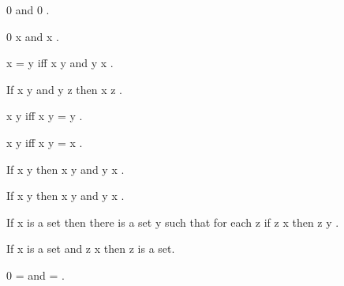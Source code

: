 \documentclass[a4paper,draft]{amsproc}
\begin{document}
\begin{forthel}
\begin{lemma*}
 0   and  0  .
\end{lemma*}

\begin{theorem}
 0 \subset x  and  x \subset {} .
\end{theorem}

\begin{theorem}
 x = y  iff  x \subset y  and  y \subset x .
\end{theorem}

\begin{theorem}
If  x \subset y  and  y \subset z  then  x \subset z .
\end{theorem}

\begin{theorem}
 x \subset y  iff  x \cup y = y .
\end{theorem}

\begin{theorem}
 x \subset y  iff  x \cap y = x .
\end{theorem}

\begin{theorem}
If  x \subset y  then  \bigcup x \subset \bigcup y 
and  \bigcap y \subset \bigcap x .
\end{theorem}

\begin{theorem}
If  x \in y  then  x \subset \bigcup y  
and  \bigcap y \subset x .
\end{theorem}


\begin{axiom}
If  x  is a set then there is a set  y  such that for each
 z  if  z \subset x  then  z \in y .
\end{axiom}


\begin{theorem}
If  x  is a set and  z \subset x  then  z  is a set.
\end{theorem}

\begin{theorem}
 0 = \bigcap {}  and   = \bigcup {} .
\end{theorem}


\end{forthel}
\end{document}
